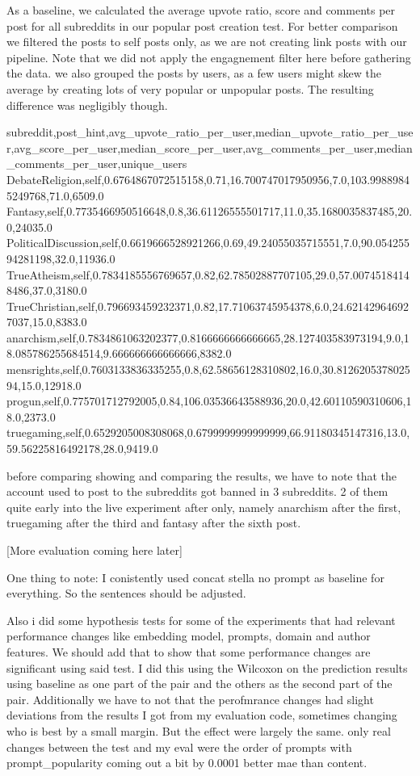 As a baseline, we calculated the average upvote ratio, score and comments per post for all subreddits in our popular post creation test. For better comparison we filtered the posts to self posts only, as we are not creating link posts with our pipeline. Note that we did not apply the engagnement filter here before gathering the data. 
we also grouped the posts by users, as a few users might skew the average by creating lots of very popular or unpopular posts. The resulting difference was negligibly though.

subreddit,post_hint,avg_upvote_ratio_per_user,median_upvote_ratio_per_user,avg_score_per_user,median_score_per_user,avg_comments_per_user,median_comments_per_user,unique_users
DebateReligion,self,0.6764867072515158,0.71,16.700747017950956,7.0,103.99889845249768,71.0,6509.0
Fantasy,self,0.7735466950516648,0.8,36.61126555501717,11.0,35.1680035837485,20.0,24035.0
PoliticalDiscussion,self,0.6619666528921266,0.69,49.24055035715551,7.0,90.05425594281198,32.0,11936.0
TrueAtheism,self,0.7834185556769657,0.82,62.78502887707105,29.0,57.00745184148486,37.0,3180.0
TrueChristian,self,0.796693459232371,0.82,17.71063745954378,6.0,24.621429646927037,15.0,8383.0
anarchism,self,0.7834861063202377,0.8166666666666665,28.127403583973194,9.0,18.085786255684514,9.666666666666666,8382.0
mensrights,self,0.7603133836335255,0.8,62.58656128310802,16.0,30.812620537802594,15.0,12918.0
progun,self,0.775701712792005,0.84,106.03536643588936,20.0,42.60110590310606,18.0,2373.0
truegaming,self,0.6529205008308068,0.6799999999999999,66.91180345147316,13.0,59.56225816492178,28.0,9419.0

before comparing showing and comparing the results, we have to note that the account used to post to the subreddits got banned in 3 subreddits. 2 of them quite early into the live experiment after only, namely anarchism after the first, truegaming after the third and fantasy after the sixth post. 

[More evaluation coming here later]








One thing to note: I conistently used concat stella no prompt as baseline for everything. So the sentences should be adjusted. 

Also i did some hypothesis tests for some of the experiments that had relevant performance changes like embedding model, prompts, domain and author features. We should add that to show that some performance changes are significant using said test. I did this using the Wilcoxon on the prediction results using baseline as one part of the pair and the others as the second part of the pair. Additionally we have to not that the perofmrance changes had slight deviations from the results I got from my evaluation code, sometimes changing who is best by a small margin. But the effect were largely the same. only real changes between the test and my eval were the order of prompts with prompt_popularity coming out a bit by 0.0001 better mae than content.